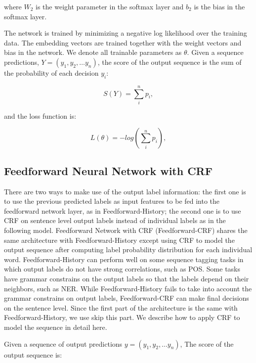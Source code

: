 \documentclass{sfuthesis}
\begin{document}
where $W_{2}$ is the weight parameter in the softmax layer and $b_{2}$ is the bias in the softmax layer.

The network is trained by minimizing a negative log likelihood over the training data. The embedding vectors are trained together with the weight vectors and bias in the network. We denote all trainable parameters as $\theta$. Given a sequence predictions, $Y=\left( y_{1},y_{2},\ldots y_{n}\right)$,
the score of the output sequence is the sum of the probability of each decision $y_{i}$: 

\begin{equation}
S\left( Y\right) = \sum _{i}^{n}p_{i},
\end{equation}

and the loss function is:

\begin{equation}
L\left(\theta\right) = -log\left(\sum _{i}^{n}p_{i}\right),
\end{equation}


\subsection{Feedforward Neural Network with CRF}
\label{Feedforward-CRF}
There are two ways to make use of the output label information: the first one is to use the previous predicted labels as input features to be fed into the feedforward network layer, as in Feedforward-History; the second one is to use CRF on sentence level output labels instead of individual labels as in the following model. Feedforward Network with CRF (Feedforward-CRF) shares the same architecture with Feedforward-History except using CRF to model the output sequence after computing label probability distribution for each individual word. Feedforward-History can perform well on some sequence tagging tasks in which output labels do not have strong correlations, such as POS. Some tasks have grammar constrains on the output labels so that the labels depend on their neighbors, such as NER. While Feedforward-History fails to take into account the grammar constrains on output labels, Feedforward-CRF can make final decisions on the sentence level. Since the first part of the architecture is the same with Feedforward-History, we use skip this part. We describe how to apply CRF to model the sequence in detail here.

Given a sequence of output predictions $y=\left( y_{1},y_{2},\ldots y_{n}\right)$,
The score of the output sequence is:
\end{document}
